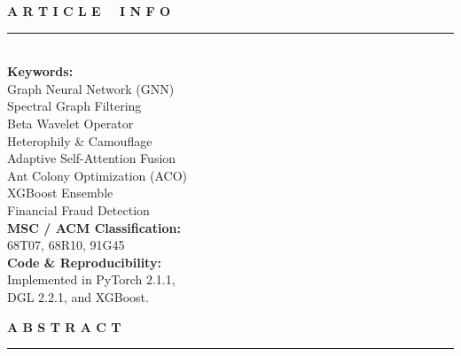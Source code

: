 \documentclass[10pt,a4paper,twocolumn]{article}
\begin{document}
{  \vspace{2pt}
  \noindent
  \begin{minipage}[t]{0.23\textwidth}
    {\normalsize\bfseries\color{darkblue} A R T I C L E \ \ I N F O}\\[4pt]
    \rule{\linewidth}{0.4pt}\\[6pt]
    {\footnotesize
    \textbf{Keywords:}\\
    Graph Neural Network (GNN)\\
    Spectral Graph Filtering\\
    Beta Wavelet Operator\\
    Heterophily \& Camouflage\\
    Adaptive Self-Attention Fusion\\
    Ant Colony Optimization (ACO)\\
    XGBoost Ensemble\\
    Financial Fraud Detection\\[8pt]
    \textbf{MSC / ACM Classification:}\\
    68T07, 68R10, 91G45\\[8pt]
    \textbf{Code \& Reproducibility:}\\
    Implemented in PyTorch 2.1.1,\\
    DGL 2.2.1, and XGBoost.
    }
  \end{minipage}%
  \hfill
  \begin{minipage}[t]{0.74\textwidth}
    {\normalsize\bfseries\color{darkblue} A B S T R A C T}\\[4pt]
    \rule{\linewidth}{0.4pt}\\[6pt]
    {\small
}
\end{minipage}}
\end{document}
